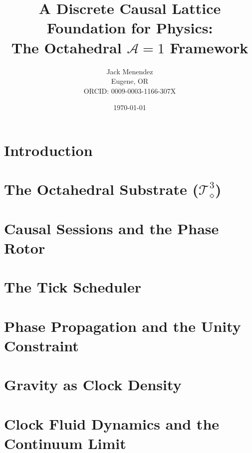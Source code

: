 \documentclass[12pt, letterpaper]{article}
\title{A Discrete Causal Lattice Foundation for Physics:\\
       \texorpdfstring{The Octahedral $\mathcal{A}=1$ Framework}
                      {The Octahedral A=1 Framework}}
\author{Jack Menendez\\
        \small Eugene, OR\\
        \small ORCID: 0009-0003-1166-307X}
\date{\today}
\begin{document}
\maketitle

\begin{abstract}
    
\end{abstract}

\newpage
\tableofcontents
\newpage

\section{Introduction}


\section{The Octahedral Substrate ($\mathcal{T}_\diamond^3$)}


\section{Causal Sessions and the Phase Rotor}


\section{The Tick Scheduler}


\section{Phase Propagation and the Unity Constraint}


\section{Gravity as Clock Density}


\section{Clock Fluid Dynamics and the Continuum Limit}

\end{document}
